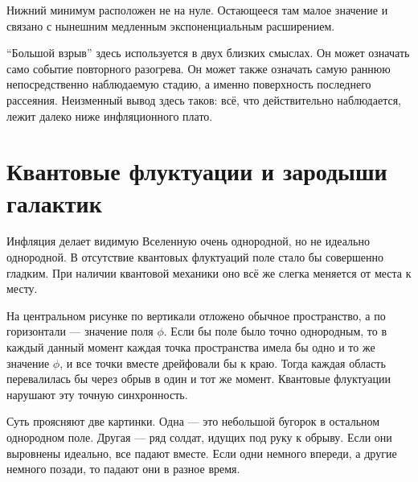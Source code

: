 Нижний минимум расположен не на нуле. Остающееся там малое значение и связано с нынешним медленным экспоненциальным расширением.

\begin{classroomqa}
\end{classroomqa}

``Большой взрыв'' здесь используется в двух близких смыслах. Он может означать само событие повторного разогрева. Он может также означать самую раннюю непосредственно наблюдаемую стадию, а именно поверхность последнего рассеяния. Неизменный вывод здесь таков: всё, что действительно наблюдается, лежит далеко ниже инфляционного плато.

\begin{classroomqa}
\end{classroomqa}

\section{Квантовые флуктуации и зародыши галактик}

Инфляция делает видимую Вселенную очень однородной, но не идеально однородной. В отсутствие квантовых флуктуаций поле стало бы совершенно гладким. При наличии квантовой механики оно всё же слегка меняется от места к месту.

На центральном рисунке по вертикали отложено обычное пространство, а по горизонтали — значение поля \(\phi\). Если бы поле было точно однородным, то в каждый данный момент каждая точка пространства имела бы одно и то же значение \(\phi\), и все точки вместе дрейфовали бы к краю. Тогда каждая область перевалилась бы через обрыв в один и тот же момент. Квантовые флуктуации нарушают эту точную синхронность.

Суть проясняют две картинки. Одна — это небольшой бугорок в остальном однородном поле. Другая — ряд солдат, идущих под руку к обрыву. Если они выровнены идеально, все падают вместе. Если одни немного впереди, а другие немного позади, то падают они в разное время.

